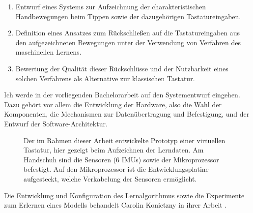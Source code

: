 \begin{enumerate}
    \item Entwurf eines Systems zur Aufzeichnung der charakteristischen
        Handbewegungen beim Tippen sowie der dazugehörigen Tastatureingaben.
    \item Definition eines Ansatzes zum Rückschließen auf die Tastatureingaben
        aus den aufgezeichneten Bewegungen unter der Verwendung von Verfahren
        des maschinellen Lernens.
    \item Bewertung der Qualität dieser Rückschlüsse und der Nutzbarkeit eines
        solchen Verfahrens als Alternative zur klassischen Tastatur.
\end{enumerate}

Ich werde in der vorliegenden Bachelorarbeit auf den Systementwurf eingehen.
Dazu gehört vor allem die Entwicklung der Hardware, also die Wahl der
Komponenten, die Mechanismen zur Datenübertragung und Befestigung, und der
Entwurf der Software-Architektur.

\begin{figure}
    \centering
    \caption[Der entwickelte Prototyp einer virtuellen Tastatur]{Der im Rahmen
    dieser Arbeit entwickelte Prototyp einer virtuellen Tastatur, hier gezeigt
    beim Aufzeichnen der Lerndaten. Am Handschuh sind die Sensoren (6 IMUs)
    sowie der Mikroprozessor befestigt. Auf den Mikroprozessor ist die
    Entwicklungsplatine aufgesteckt, welche Verkabelung der Sensoren
    ermöglicht.}
\end{figure}

Die Entwicklung und Konfiguration des Lernalgorithmus sowie die Experimente zum
Erlernen eines Modells behandelt Carolin Konietzny in ihrer Arbeit \citep{caro}.

